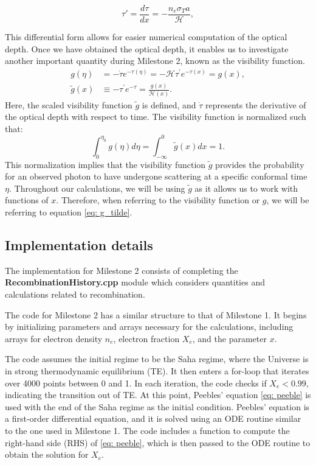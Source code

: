 \documentclass{aa}
\begin{document}
\begin{equation}
\tau' = \frac{d\tau}{dx} = -\frac{n_e \sigma_T a}{\mathcal{H}},
\label{eq: tauprime}
\end{equation}

This differential form allows for easier numerical computation of the optical depth. Once we have obtained the optical depth, it enables us to investigate another important quantity during Milestone 2, known as the visibility function.
\begin{align}
g(\eta)&=-\dot{\tau} e^{-\tau(\eta)}=-\mathcal{H} \tau^{\prime}
e^{-\tau(x)}=g(x)\label{eq: g},\\
\tilde{g}(x) &\equiv-\tau^{\prime}
e^{-\tau}=\frac{g(x)}{\mathcal{H}(x)}.\label{eq: g_tilde}
\end{align}
Here, the scaled visibility function $\tilde{g}$ is defined, and $\dot{\tau}$ represents the derivative of the optical depth with respect to time. The visibility function is normalized such that:
\begin{equation}
    \int_{0}^{\eta_{0}} g(\eta) d \eta=\int_{-\infty}^{0} \tilde{g}(x) d x=1.
\end{equation}
This normalization implies that the visibility function $\tilde{g}$ provides the probability for an observed photon to have undergone scattering at a specific conformal time $\eta$. Throughout our calculations, we will be using $\tilde{g}$ as it allows us to work with functions of $x$. Therefore, when referring to the visibility function or $g$, we will be referring to equation \eqref{eq: g_tilde}.


\subsection{Implementation details}
The implementation for Milestone 2 consists of completing the \textbf{RecombinationHistory.cpp} module which considers quantities and calculations related to recombination.

The code for Milestone 2 has a similar structure to that of Milestone 1. It begins by initializing parameters and arrays necessary for the calculations, including arrays for electron density $n_e$, electron fraction $X_e$, and the parameter $x$.

The code assumes the initial regime to be the Saha regime, where the Universe is in strong thermodynamic equilibrium (TE). It then enters a for-loop that iterates over 4000 points between 0 and 1. In each iteration, the code checks if $X_e < 0.99$, indicating the transition out of TE. At this point, Peebles' equation \eqref{eq: peeble} is used with the end of the Saha regime as the initial condition. Peebles' equation is a first-order differential equation, and it is solved using an ODE routine similar to the one used in Milestone 1. The code includes a function to compute the right-hand side (RHS) of \eqref{eq: peeble}, which is then passed to the ODE routine to obtain the solution for $X_e$.
\end{document}
